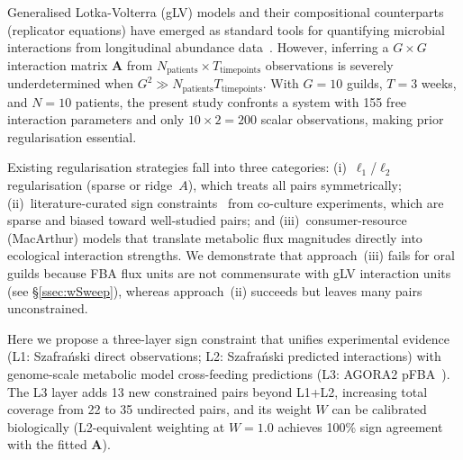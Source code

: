 \documentclass[11pt,a4paper]{article}
\newcommand{\bA}{\mathbf{A}}
\begin{document}
Generalised Lotka-Volterra (gLV) models and their compositional counterparts
(replicator equations) have emerged as standard tools for quantifying microbial
interactions from longitudinal abundance data~\citep{joseph2020, brunner2023}.
However, inferring a $G{\times}G$ interaction matrix $\bA$ from
$N_\text{patients} \times T_\text{timepoints}$ observations is severely
underdetermined when $G^2 \gg N_\text{patients} T_\text{timepoints}$.
With $G=10$ guilds, $T=3$ weeks, and $N=10$ patients, the present study
confronts a system with 155 free interaction parameters and only
$10 \times 2 = 200$ scalar observations, making prior regularisation essential.

Existing regularisation strategies fall into three categories:
(i)~$\ell_1$/$\ell_2$ regularisation (sparse or ridge~$A$), which treats all
pairs symmetrically;
(ii)~literature-curated sign constraints~\citep{kutz2019} from co-culture
experiments, which are sparse and biased toward well-studied pairs; and
(iii)~consumer-resource (MacArthur) models that translate metabolic flux
magnitudes directly into ecological interaction strengths.
We demonstrate that approach~(iii) fails for oral guilds because FBA flux
units are not commensurate with gLV interaction units (see §\ref{ssec:wSweep}),
whereas approach~(ii) succeeds but leaves many pairs unconstrained.

Here we propose a three-layer sign constraint that unifies experimental evidence
(L1: Szafra\'{n}ski direct observations; L2: Szafra\'{n}ski predicted
interactions) with genome-scale metabolic model cross-feeding predictions
(L3: AGORA2 pFBA~\citep{heinken2023}).
The L3 layer adds 13 new constrained pairs beyond L1+L2, increasing total
coverage from 22 to 35 undirected pairs, and its weight $W$ can be calibrated
biologically (L2-equivalent weighting at $W{=}1.0$ achieves 100\% sign
agreement with the fitted $\bA$).
\end{document}
